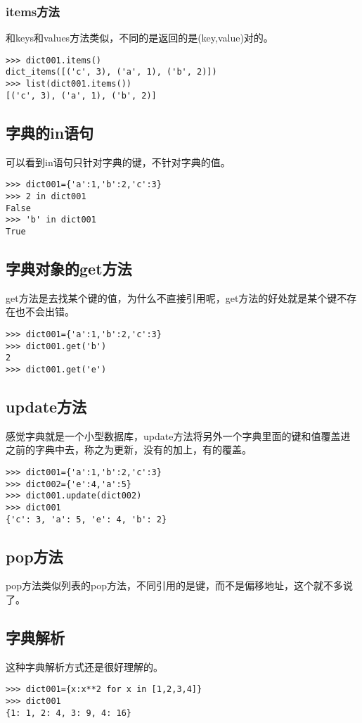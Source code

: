 \documentclass[12pt,oneside]{book}
\begin{document}
\begin{common-format}
\subsubsection{items方法}
和keys和values方法类似，不同的是返回的是(key,value)对的。
\begin{Verbatim}
>>> dict001.items()
dict_items([('c', 3), ('a', 1), ('b', 2)])
>>> list(dict001.items())
[('c', 3), ('a', 1), ('b', 2)]
\end{Verbatim}



\subsection{字典的in语句}
可以看到in语句只针对字典的键，不针对字典的值。
\begin{Verbatim}
>>> dict001={'a':1,'b':2,'c':3}
>>> 2 in dict001
False
>>> 'b' in dict001
True
\end{Verbatim}

\subsection{字典对象的get方法}
get方法是去找某个键的值，为什么不直接引用呢，get方法的好处就是某个键不存在也不会出错。
\begin{Verbatim}
>>> dict001={'a':1,'b':2,'c':3}
>>> dict001.get('b')
2
>>> dict001.get('e')
\end{Verbatim}

\subsection{update方法}
感觉字典就是一个小型数据库，update方法将另外一个字典里面的键和值覆盖进之前的字典中去，称之为更新，没有的加上，有的覆盖。
\begin{Verbatim}
>>> dict001={'a':1,'b':2,'c':3}
>>> dict002={'e':4,'a':5}
>>> dict001.update(dict002)
>>> dict001
{'c': 3, 'a': 5, 'e': 4, 'b': 2}
\end{Verbatim}

\subsection{pop方法}
pop方法类似列表的pop方法，不同引用的是键，而不是偏移地址，这个就不多说了。



\subsection{字典解析}
\label{sec:字典解析}
这种字典解析方式还是很好理解的。
\begin{Verbatim}
>>> dict001={x:x**2 for x in [1,2,3,4]}
>>> dict001
{1: 1, 2: 4, 3: 9, 4: 16}
\end{Verbatim}


\end{common-format}
\end{document}
